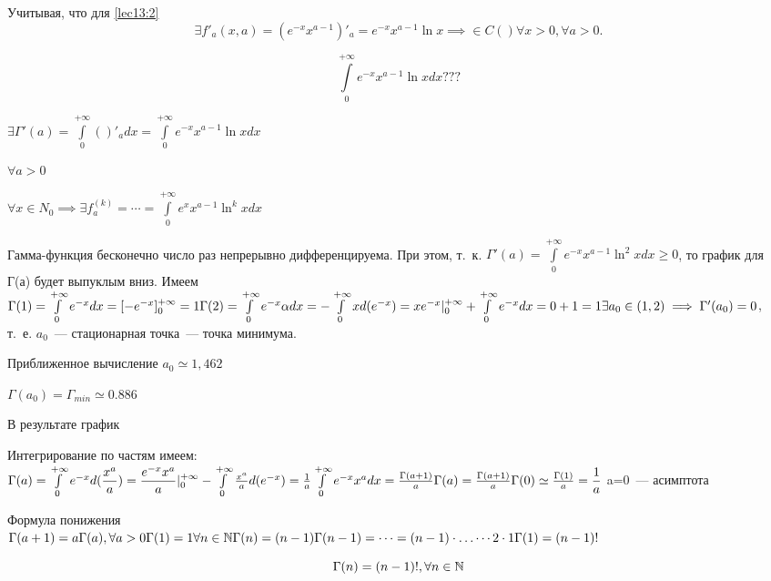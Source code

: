 \documentclass[../../main.tex]{subfiles}
\begin{document}
Учитывая, что для \eqref{lec13:2}
\[
\exists f'_a(x, a) = (e^{-x} x^{a-1})'_a = e^{-x}x^{a-1} \ln x \implies \in 
C() \forall x > 0, \forall a > 0.
\]

\[
\int\limits_0^{+\infty} e^{-x} x^{a-1} \ln x dx ???
\]

$
\exists \Gamma'(a) = \int\limits_0^{+\infty} ()'_a dx = \int\limits_0^{+\infty} 
e^{-x} x^{a-1} \ln x dx 
$

$\forall a > 0$

$
\forall x \in N_0 \implies \exists f^{(k)}_a = \cdots = 
\int\limits_0^{+\infty} e^x x^{a-1} \ln^k x dx 
$

Гамма-функция бесконечно число раз непрерывно дифференцируема.
При этом, т.~к. $\Gamma'(a) = \int\limits_0^{+\infty} e^{-x} x^{a-1} \ln^2 x dx \ge 
0$,
то график для Г(а) будет выпуклым вниз. Имеем
$
\Gamma(1) = \int\limits_0^{+\infty} e^{-x} dx = [-e^{-x}]^{+\infty}_0 = 1
\\
\Gamma(2) = \int\limits_0^{+\infty} e^{-x} \alpha dx = 
- \int\limits_0^{+\infty} x d(e^{-x}) = 
xe^{-x}|^{+\infty}_0 + \int\limits_0^{+\infty} e^{-x} dx = 
0 + 1 = 1
\\
\exists a_0 \in (1, 2) \implies \Gamma'(a_0) = 0$, т.~е. $a_0$~--- стационарная 
точка~--- точка минимума.

Приближенное вычисление $a_0 \simeq 1,462$

$\Gamma(a_0) = \Gamma_{min} \simeq 0.886$

В результате график

Интегрирование по частям имеем:
$
\Gamma(a) = \int\limits_0^{+\infty} e^{-x} d(\dfrac{x^a}{a}) =
 \dfrac{e^{-x}x^a}{a} |^{+\infty}_0 - \int\limits_0^{+\infty} \frac{x^a}{a} 
 d(e^{-x}) = 
 \frac{1}{a} \int\limits_0^{+\infty} e^{-x} x^a dx = \frac{\Gamma(a+1)}{a}
\\
\Gamma(a) = \frac{\Gamma(a+1)}{a}
\\
\Gamma(0) \simeq \frac{\Gamma(1)}{a} = \dfrac{1}{a}
$
a=0~--- асимптота

Формула понижения
\\
$
\Gamma(a+1) = a\Gamma(a), \forall a > 0
\\
\Gamma(1) = 1
\\
\forall n \in \mathbb{N}
\\
\Gamma(n) = (n-1)\Gamma(n-1) = \cdots = (n-1) \cdot \ldots \cdots 2 \cdot 1 \Gamma(1) = (n-1)!
$

\begin{equation}
\label{lec13:4}
\Gamma(n) = (n-1)!,  \forall n \in \mathbb{N}
\end{equation}
\end{document}

